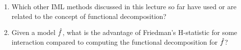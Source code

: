 \begin{enumerate}
    \item 
    Which other IML methods discussed in this lecture so far have used or are related to the concept of functional decomposition?
    \item 
    Given a model $\hat{f}$, what is the advantage of Friedman's H-statistic for some interaction compared to computing the functional decomposition for $\hat{f}$?

\end{enumerate}